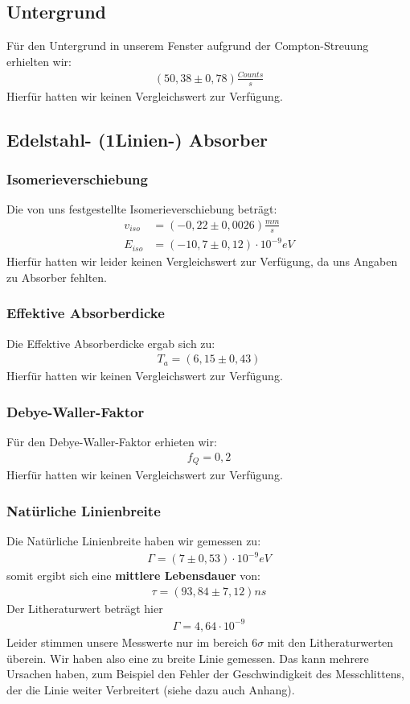 \documentclass[12pt]{article}
\begin{document}
\subsection*{Untergrund}
Für den Untergrund in unserem Fenster aufgrund der Compton-Streuung erhielten wir:
\begin{align*}
 (50,38 \pm 0,78) \frac{Counts}{s}
\end{align*}
Hierfür hatten wir keinen Vergleichswert zur Verfügung.

\subsection*{Edelstahl- (1Linien-) Absorber}
\subsubsection*{Isomerieverschiebung}
Die von uns festgestellte Isomerieverschiebung beträgt:
\begin{align*}
 v_{iso} &= ( -0,22 \pm 0,0026) \frac{mm}{s} \\
 E_{iso} &= ( -10,7 \pm 0,12 ) \cdot 10^{-9} eV
\end{align*}
Hierfür hatten wir leider keinen Vergleichswert zur Verfügung, da uns Angaben zu Absorber fehlten.

\subsubsection*{Effektive Absorberdicke}
Die Effektive Absorberdicke ergab sich zu:
\begin{align*}
 T_a = ( 6,15 \pm 0,43 )
\end{align*}
Hierfür hatten wir keinen Vergleichswert zur Verfügung.

\subsubsection*{Debye-Waller-Faktor}
Für den Debye-Waller-Faktor erhieten wir:
\begin{align*}
 f_Q = 0,2
\end{align*}
Hierfür hatten wir keinen Vergleichswert zur Verfügung.

\subsubsection*{Natürliche Linienbreite}
Die Natürliche Linienbreite haben wir gemessen zu:
\begin{align*}
 \Gamma = ( 7 \pm 0,53) \cdot 10^{-9} eV
\end{align*}
somit ergibt sich eine \textbf{mittlere Lebensdauer} von:
\begin{align*}
 \tau = (93,84 \pm 7,12) ns
\end{align*}
Der Litheraturwert beträgt hier
\begin{align*}
 \Gamma = 4,64 \cdot 10^{-9} 
\end{align*}
Leider stimmen unsere Messwerte nur im bereich $6\sigma$ mit den Litheraturwerten überein. Wir haben also eine zu breite Linie gemessen. Das kann mehrere Ursachen haben, zum Beispiel den Fehler der Geschwindigkeit des Messchlittens, der die Linie weiter Verbreitert (siehe dazu auch Anhang).
\end{document}
